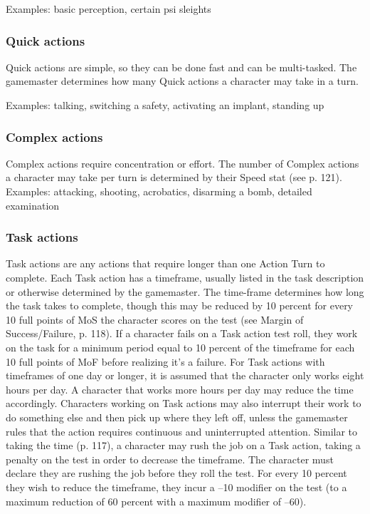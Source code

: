 Examples: basic perception, certain psi sleights 

\subsubsection{Quick actions} \label{sec:quick-actions} 

Quick actions are simple, so they can be done fast and can be multi-tasked. The gamemaster determines how many Quick actions a character may take in a turn. 

Examples: talking, switching a safety, activating an implant, standing up 

\subsubsection{Complex actions} \label{sec:complex-actions} 

Complex actions require concentration or effort. The number of Complex actions a character may take per turn is determined by their Speed stat (see p. 121). Examples: attacking, shooting, acrobatics, disarming a bomb, detailed examination 

\subsubsection{Task actions} \label{sec:task-actions} 

Task actions are any actions that require longer than one Action Turn to complete. Each Task action has a timeframe, usually listed in the task description or otherwise determined by the gamemaster. The time-frame determines how long the task takes to complete, though this may be reduced by 10 percent for every 10 full points of MoS the character scores on the test (see Margin of Success/Failure, p. 118). If a character fails on a Task action test roll, they work on the task for a minimum period equal to 10 percent of the timeframe for each 10 full points of MoF before realizing it's a failure. For Task actions with timeframes of one day or longer, it is assumed that the character only works eight hours per day. A character that works more hours per day may reduce the time accordingly. Characters working on Task actions may also interrupt their work to do something else and then pick up where they left off, unless the gamemaster rules that the action requires continuous and uninterrupted attention. Similar to taking the time (p. 117), a character may rush the job on a Task action, taking a penalty on the test in order to decrease the timeframe. The character must declare they are rushing the job before they roll the test. For every 10 percent they wish to reduce the timeframe, they incur a –10 modifier on the test (to a maximum reduction of 60 percent with a maximum modifier of –60). 

